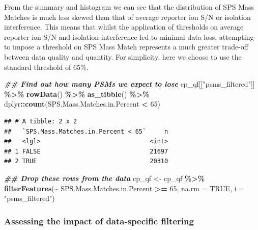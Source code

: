 \documentclass[9pt,a4paper,]{extarticle}
\newenvironment{Shaded}{\begin{snugshade}}{\end{snugshade}}
\newcommand{\AttributeTok}[1]{\textcolor[rgb]{0.13,0.29,0.53}{#1}}
\newcommand{\ConstantTok}[1]{\textcolor[rgb]{0.56,0.35,0.01}{#1}}
\newcommand{\DecValTok}[1]{\textcolor[rgb]{0.00,0.00,0.81}{#1}}
\newcommand{\DocumentationTok}[1]{\textcolor[rgb]{0.56,0.35,0.01}{\textbf{\textit{#1}}}}
\newcommand{\FunctionTok}[1]{\textcolor[rgb]{0.13,0.29,0.53}{\textbf{#1}}}
\newcommand{\NormalTok}[1]{#1}
\newcommand{\OtherTok}[1]{\textcolor[rgb]{0.56,0.35,0.01}{#1}}
\newcommand{\SpecialCharTok}[1]{\textcolor[rgb]{0.81,0.36,0.00}{\textbf{#1}}}
\newcommand{\StringTok}[1]{\textcolor[rgb]{0.31,0.60,0.02}{#1}}
\begin{document}
From the summary and histogram we can see that the distribution of SPS Mass
Matches is much less skewed than that of average reporter ion S/N or isolation
interference. This means that whilst the application of thresholds on average
reporter ion S/N and isolation interference led to minimal data loss, attempting
to impose a threshold on SPS Mass Match represents a much greater trade-off
between data quality and quantity. For simplicity, here we choose to use the
standard threshold of 65\%.

\begin{Shaded}
\begin{Highlighting}[]
\DocumentationTok{\#\# Find out how many PSMs we expect to lose}
\NormalTok{cp\_qf[[}\StringTok{"psms\_filtered"}\NormalTok{]] }\SpecialCharTok{\%\textgreater{}\%} 
  \FunctionTok{rowData}\NormalTok{() }\SpecialCharTok{\%\textgreater{}\%} 
  \FunctionTok{as\_tibble}\NormalTok{() }\SpecialCharTok{\%\textgreater{}\%} 
\NormalTok{  dplyr}\SpecialCharTok{::}\FunctionTok{count}\NormalTok{(SPS.Mass.Matches.in.Percent }\SpecialCharTok{\textless{}} \DecValTok{65}\NormalTok{)}
\end{Highlighting}
\end{Shaded}

\begin{verbatim}
## # A tibble: 2 x 2
##   `SPS.Mass.Matches.in.Percent < 65`     n
##   <lgl>                              <int>
## 1 FALSE                              21697
## 2 TRUE                               20310
\end{verbatim}

\begin{Shaded}
\begin{Highlighting}[]
\DocumentationTok{\#\# Drop these rows from the data}
\NormalTok{cp\_qf }\OtherTok{\textless{}{-}}\NormalTok{ cp\_qf }\SpecialCharTok{\%\textgreater{}\%}
  \FunctionTok{filterFeatures}\NormalTok{(}\SpecialCharTok{\textasciitilde{}}\NormalTok{ SPS.Mass.Matches.in.Percent }\SpecialCharTok{\textgreater{}=} \DecValTok{65}\NormalTok{, }
                 \AttributeTok{na.rm =} \ConstantTok{TRUE}\NormalTok{,}
                 \AttributeTok{i =} \StringTok{"psms\_filtered"}\NormalTok{)}
\end{Highlighting}
\end{Shaded}

\hypertarget{assessing-the-impact-of-data-specific-filtering}{%
\subsubsection{Assessing the impact of data-specific filtering}\label{assessing-the-impact-of-data-specific-filtering}}
\end{document}

